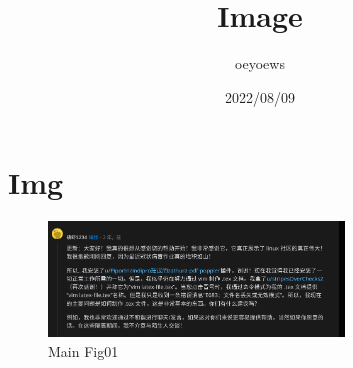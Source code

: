 \documentclass{article}
\title{Image}
\author{oeyoews}
\date{2022/08/09}
\begin{document}
\maketitle

\listoffigures

\newpage

\section{Img}
\label{sec:img}

\begin{figure}[H]
\centering
\includegraphics[width=0.7\textwidth]{img/01.png}
\caption{Main Fig01 }
\label{Fig 00}
\end{figure}
\end{document}
